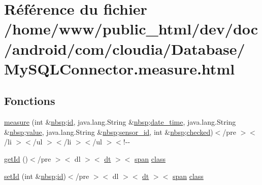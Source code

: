 \hypertarget{_my_s_q_l_connector_8measure_8html}{\section{Référence du fichier /home/www/public\-\_\-html/dev/doc/android/com/cloudia/\-Database/\-My\-S\-Q\-L\-Connector.measure.\-html}
\label{_my_s_q_l_connector_8measure_8html}
}
\subsection*{Fonctions}
\begin{DoxyCompactItemize}
\item 
\hyperlink{_my_s_q_l_connector_8measure_8html_a6990f6ca63e81db771feab5caa7bed38}{measure} (int \&\hyperlink{_tools_8html_aef915316f784c9063d942974538301a6}{nbsp};\hyperlink{index-9_8html_aa9b8ff1d03b739d1e752b9d9a5aa7c98}{id}, java.\-lang.\-String \&\hyperlink{_tools_8html_aef915316f784c9063d942974538301a6}{nbsp};\hyperlink{_my_s_q_l_connector_8measure_8html_a2ebe356a2a4f9bab3a6c50f65ccc86d5}{date\-\_\-time}, java.\-lang.\-String \&\hyperlink{_tools_8html_aef915316f784c9063d942974538301a6}{nbsp};\hyperlink{_my_s_q_l_connector_8measure_8html_afcc7a4b78ecd8fa7e713f8cfa0f51017}{value}, java.\-lang.\-String \&\hyperlink{_tools_8html_aef915316f784c9063d942974538301a6}{nbsp};\hyperlink{_my_s_q_l_connector_8measure_8html_a48a4081a48bf69abc4ba5d704ec33919}{sensor\-\_\-id}, int \&\hyperlink{_tools_8html_aef915316f784c9063d942974538301a6}{nbsp};\hyperlink{_login_activity_8_user_login_task_8html_a5fdeb16ca19e138087f9c484ca68188d}{checked})$<$/pre $>$$<$/li $>$$<$/ul $>$$<$/li $>$$<$/ul $>$$<$!-\/-\/
\item 
\hyperlink{_my_s_q_l_connector_8measure_8html_ab3a0e513db813f22df2ca23e118d35a9}{get\-Id} ()$<$/pre $>$$<$ dl $>$$<$ \hyperlink{stylesheet_8css_a107565fb4039d33b041380d6e0ea1d80}{dt} $>$$<$ \hyperlink{stylesheet_8css_a8343996ebcf16220b04e54659aac31cc}{span} \hyperlink{_tools_8html_acf06f836132665ba8114f5a414c2403f}{class}
\item 
\hyperlink{_my_s_q_l_connector_8measure_8html_a6ba9489e16376022eacd82f234b7c21f}{set\-Id} (int \&\hyperlink{_tools_8html_aef915316f784c9063d942974538301a6}{nbsp};\hyperlink{index-9_8html_aa9b8ff1d03b739d1e752b9d9a5aa7c98}{id})$<$/pre $>$$<$ dl $>$$<$ \hyperlink{stylesheet_8css_a107565fb4039d33b041380d6e0ea1d80}{dt} $>$$<$ \hyperlink{stylesheet_8css_a8343996ebcf16220b04e54659aac31cc}{span} \hyperlink{_tools_8html_acf06f836132665ba8114f5a414c2403f}{class}
$$
\end{DoxyCompactItemize}
